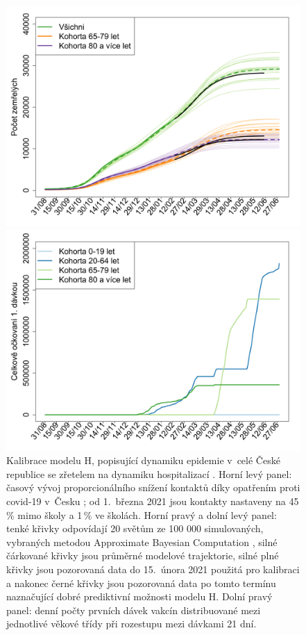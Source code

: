 \begin{figure}[ht]
\begin{center}
\begin{minipage}[m]{0.45\linewidth}
			\includegraphics[width=\textwidth]{pic/vakcinace-death.png}
		\end{minipage} 
		\begin{minipage}[m]{0.45\linewidth}
			\includegraphics[width=\textwidth]{pic/vakcinace-davky.png}
		\end{minipage} 
	\end{center}
	\caption{Kalibrace modelu H, popisující dynamiku epidemie v~celé České republice se zřetelem na dynamiku hospitalizací \cite{vaccpaper}. Horní levý panel: časový vývoj proporcionálního snížení kontaktů díky opatřením proti covid-19 v~Česku \cite{paqcovid}; od 1.\ března 2021 jsou kontakty nastaveny na 45\,\% mimo školy a 1\,\% ve školách. Horní pravý a dolní levý panel: tenké křivky odpovídají 20  světům ze 100 000 simulovaných, vybraných metodou Approximate Bayesian Computation \cite{Toni_etal2009}, silné čárkované křivky jsou průměrné modelové trajektorie, silné plné křivky jsou pozorovaná data do 15.\ února 2021 použitá pro kalibraci a nakonec černé křivky jsou pozorovaná data po tomto termínu naznačující dobré prediktivní možnosti modelu H. Dolní pravý panel: denní počty prvních dávek vakcín distribuované mezi jednotlivé věkové třídy při rozestupu mezi dávkami 21 dní.}
	\label{kalibraceH}
\end{figure}

